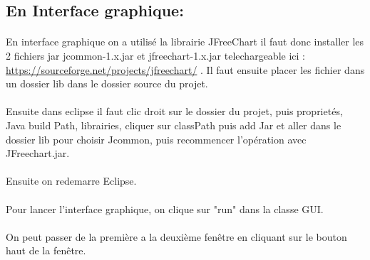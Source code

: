 \paragraph{}

\subsection{En Interface graphique:}

\paragraph{}En interface graphique on a utilisé la librairie JFreeChart il faut donc installer les 2 fichiers jar jcommon-1.x.jar et jfreechart-1.x.jar telechargeable ici : \url{https://sourceforge.net/projects/jfreechart/} . Il faut ensuite placer les fichier dans un dossier lib dans le dossier source du projet.

\paragraph{}Ensuite dans eclipse il faut clic droit sur le dossier du projet, puis proprietés, Java build Path, librairies, cliquer sur classPath puis add Jar et aller dans le dossier lib pour choisir Jcommon, puis recommencer l'opération avec JFreechart.jar. 



\paragraph{}Ensuite on redemarre Eclipse.

\paragraph{} Pour lancer l'interface graphique, on clique sur "run" dans la classe GUI.

\paragraph{} On peut passer de la première a la deuxième fenêtre en cliquant sur le bouton haut de la fenêtre.

